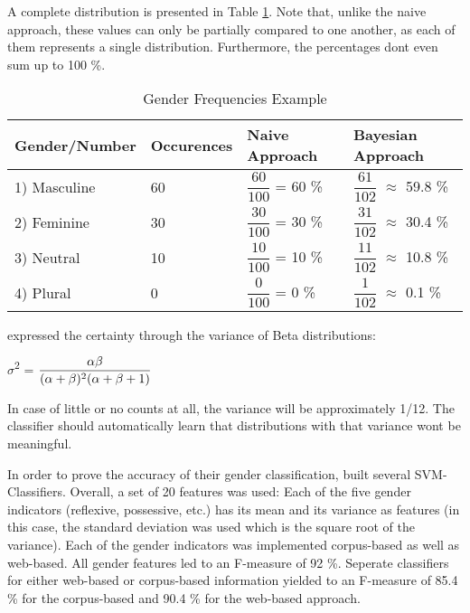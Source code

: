A complete distribution is presented in Table \ref{table:bergsma2004GenderFreqTable}. Note that, unlike the naive approach, these values can only be partially compared to one another, as each of them represents a single distribution. Furthermore, the percentages dont even sum up to 100 \%.

\begin{table}[h]
    \renewcommand{\arraystretch}{2.0}
    \begin{tabular}{| l | l | l | l |}
    \hline
    Gender/Number & Occurences & Naive Approach & Bayesian Approach \\ \hline
\hline
    1) Masculine & 60 & $\dfrac{60}{100}$ = 60 \% &  $\dfrac{61}{102}$ $\approx$ 59.8 \% \\ \hline
    2) Feminine & 30 &  $\dfrac{30}{100}$ = 30 \% &  $\dfrac{31}{102}$ $\approx$ 30.4 \% \\ \hline
    3) Neutral & 10 & $\dfrac{10}{100}$ = 10 \% & $\dfrac{11}{102}$ $\approx$ 10.8 \%  \\ \hline
    4) Plural & 0 &    $\dfrac{0}{100}$ =  0 \% &  $\dfrac{1}{102}$ $\approx$ 0.1 \% \\ \hline
    \end{tabular}
      \caption{Gender Frequencies Example}
     \label{table:bergsma2004GenderFreqTable}
\end{table}



 \cite{bergsma2005automatic} expressed the certainty through the variance of Beta distributions:

\begin{center}
	$\sigma$\textsuperscript{2} =  $\dfrac{\alpha \beta }{(\alpha + \beta)\textsuperscript{2}(\alpha + \beta + 1)}$
\end{center}

In case of little or no counts at all, the variance will be approximately 1/12. The classifier should automatically learn that distributions with that variance wont be meaningful.

In order to prove the accuracy of their gender classification, \cite{bergsma2005automatic} built several SVM-Classifiers. Overall, a set of 20 features was used: Each of the five gender indicators (reflexive, possessive, etc.) has its mean and its variance as features (in this case, the standard deviation was used which is the square root of the variance). Each of the gender indicators was implemented corpus-based as well as web-based. All gender features led to an F-measure of 92 \%. Seperate classifiers for either web-based or corpus-based information yielded to an F-measure of 85.4 \% for the corpus-based and 90.4 \% for the web-based approach.

